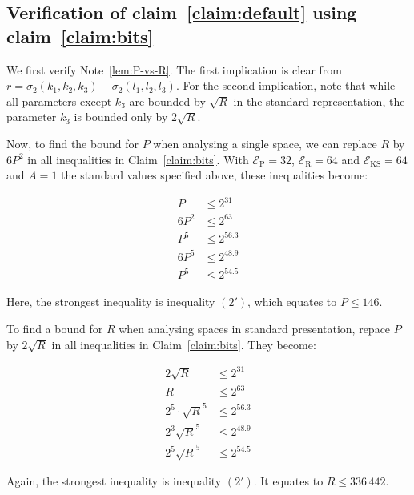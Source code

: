\documentclass{article}
\newcommand{\expP}{\mathcal E_{\text{P}}}
\newcommand{\expR}{\mathcal E_{\text{R}}}
\newcommand{\expKS}{\mathcal E_{\text{KS}}}
\begin{document}
\subsection*{Verification of claim~\ref{claim:default} using claim~\ref{claim:bits}}

We first verify Note~\ref{lem:P-vs-R}.
The first implication is clear from \(r = \sigma_2(k_1,k_2,k_3) - \sigma_2(l_1,l_2,l_3)\).
For the second implication, note that while all parameters except \(k_3\) are bounded by \(\sqrt{R}\) in the standard representation, the parameter \(k_3\) is bounded only by \(2\sqrt{R}\).

Now, to find the bound for \(P\) when analysing a single space, we can replace \(R\) by \(6P^2\) in all inequalities in Claim~\ref{claim:bits}. With \(\expP=32\), \(\expR=64\) and \(\expKS=64\) and \(A=1\) the standard values specified above, these inequalities become:
\begin{multicols}{3}
  \noindent\allowdisplaybreaks
  \begin{align*}
    P & \leq 2^{31}  \label{eq:bits:PeP}\tag{$a$}     \\
    6P^2 & \leq 2^{63}  \label{eq:bits:ReR}\tag{$a'$}        \\
    P^5  & \leq 2^{56.3} \label{eq:bits:PeKS} \tag{$b$}  \\
    6P^5 & \leq 2^{48.9} \label{eq:bits:RPeKS} \tag{$b'$} \\
    P^5  & \leq 2^{54.5}\label{eq:bits:PsKS} \tag{$c$}
  \end{align*}
\end{multicols}
Here, the strongest inequality is inequality \((2')\), which equates to \(P\leq 146\).

To find a bound for \(R\) when analysing spaces in standard presentation, repace \(P\) by \(2\sqrt{R}\) in all inequalities in Claim~\ref{claim:bits}.  They become:
\begin{multicols}{3}
  \noindent\allowdisplaybreaks
  \begin{align*}
    2\sqrt{R} & \leq 2^{31}  \label{eq:bits:PeP}\tag{$a$}     \\
    R    & \leq 2^{63}  \label{eq:bits:ReR}\tag{$a'$}        \\
    2^5·\sqrt{R}^5  & \leq 2^{56.3} \label{eq:bits:PeKS} \tag{$b$}  \\
    2^3 \sqrt{R}^5 & \leq 2^{48.9} \label{eq:bits:RPeKS} \tag{$b'$} \\
    2^5\sqrt{R}^5  & \leq 2^{54.5}\label{eq:bits:PsKS} \tag{$c$}
  \end{align*}
\end{multicols}
Again, the strongest inequality is inequality \((2')\).  It equates to \(R\leq 336\,442\).
\end{document}
